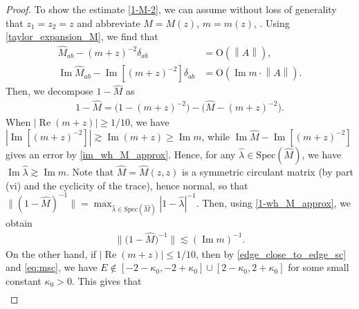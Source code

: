 \documentclass[10pt,reqno]{amsart}
\numberwithin{equation}{section}
\numberwithin{figure}{section}
\theoremstyle{plain} %
\theoremstyle{definition} %
\newcommand{\wh}{\widehat}
\renewcommand{\leq}{\le}
\renewcommand{\geq}{\ge}
\newcommand{\qq}[1]{[\![{#1}]\!]}
\newcommand{\p}[1]{({#1})}
\newcommand{\pa}[1]{\left({#1}\right)}
\newcommand{\q}[1]{[{#1}]}
\newcommand{\qa}[1]{\left[{#1}\right]}
\newcommand{\abs}[1]{\lvert #1 \rvert}
\newcommand{\absa}[1]{\left\lvert #1 \right\rvert}
\newcommand{\norma}[1]{\left\lVert #1 \right\rVert}
\DeclareMathOperator{\re}{\mathrm{Re}}
\DeclareMathOperator{\im}{\mathrm{Im}}
\newcommand{\OO}{\mathrm{O}}
\numberwithin{equation}{section}
\begin{document}
\begin{proof}
To show the estimate \eqref{1-M-2}, we can assume without loss of generality that $z_1=z_2=z$ and abbreviate $M=M(z)$, $m=m (z)$, \smash{$\wh M(z_1,z_2)=\wh M$}. Using \eqref{taylor_expansion_M}, we find that
    \begin{align}\label{wh_M_approx}
            \wh M_{ab}-\pa{m+z}^{-2}\delta_{ab}&=\OO\pa{\norma{A}},\\
            \label{im_wh_M_approx}
            \im \wh M_{ab}-\im [\pa{m+z}^{-2}]\delta_{ab}&=\OO\pa{\im m\cdot \norma{A}}.
        \end{align}
Then, we decompose $1-\wh M$ as
    \begin{equation}\label{1-wh_M_approx}
        \begin{aligned}
            1-\wh M=\big(1-\pa{m+z}^{-2}\big)-\big(\wh M-\pa{m+z}^{-2}\big).
        \end{aligned}
    \end{equation}
    When $\absa{\re \pa{m+z}}\geq 1/10$, we have
        \(|\im \q{\pa{m+z}^{-2}}|\gtrsim \im\pa{m+z}\geq \im m\),
    while $\im  \wh M - \im[\pa{m+z}^{-2}]$ gives an error by \eqref{im_wh_M_approx}. 
    Hence, for any $\wh \lambda\in \mathrm{Spec}\p{\wh M}$, we have $\im \wh \lambda\gtrsim \im m$. Note that $\wh M=\wh M(z,z)$ is a symmetric circulant matrix (by part (vi) and the cyclicity of the trace), hence normal, so that $\|(1-\wh M)^{-1}\|=\max_{\wh\lambda\in\mathrm{Spec}(\wh M)}|1-\wh\lambda|^{-1}$. Then, using \eqref{1-wh_M_approx}, we obtain 
    \begin{equation}\nonumber
        \begin{aligned}
            \big\|\big(1-\wh M\big)^{-1}\big\|\lesssim \pa{\im m}^{-1}.
        \end{aligned}
    \end{equation}
    On the other hand, if $\abs{\re \pa{m+z}}\leq 1/10$, then by \eqref{edge_close_to_edge_sc} and \eqref{eq:msc}, we have $E\notin\qa{-2-\kappa_0,-2+\kappa_0}\cup\qa{2-\kappa_0,2+\kappa_0}$ for some small constant $\kappa_0>0$. This gives that
    \begin{equation}\nonumber
        \begin{aligned}

\end{aligned}
\end{equation}
\end{proof}
\end{document}
